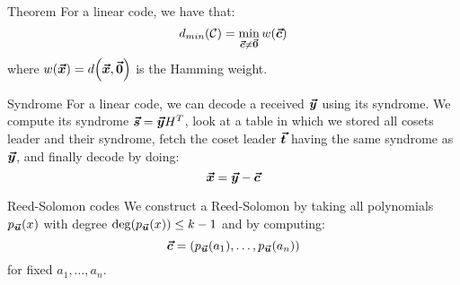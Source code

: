 \documentclass[a4paper]{article}
\begin{document}
\begin{parag}{Theorem}
    For a linear code, we have that: 
    \[d_{min}\left(\mathcal{C}\right) = \min_{\bvec{c} \neq \bvec{0}} w\left(\bvec{c}\right)\]
    where $w\left(\bvec{x}\right) = d\left(\bvec{x}, \bvec{0}\right)$ is the Hamming weight.
\end{parag}

\begin{parag}{Syndrome}
    For a linear code, we can decode a received $\bm{\protect\vec{y}}$ using its syndrome. We compute its syndrome $\bm{\protect\vec{s}} = \bm{\protect\vec{y}} H^T$, look at a table in which we stored all cosets leader and their syndrome, fetch the coset leader $\bm{\protect\vec{t}}$ having the same syndrome as $\bm{\protect\vec{y}}$, and finally decode by doing:
    \[\bm{\protect\vec{x}} = \bm{\protect\vec{y}} - \bm{\protect\vec{c}}\]
\end{parag}

\begin{parag}{Reed-Solomon codes}
    We construct a Reed-Solomon by taking all polynomials $p_{\bvec{u}}\left(x\right)$ with degree $\deg\left(p_{\bvec{u}}\left(x\right)\right) \leq k-1$ and by computing: 
    \[\bvec{c} = \left(p_{\bvec{u}}\left(a_1\right), \ldots, p_{\bvec{u}}\left(a_n\right)\right)\]
    for fixed $a_1, \ldots, a_n$.
\end{parag}
\end{document}

